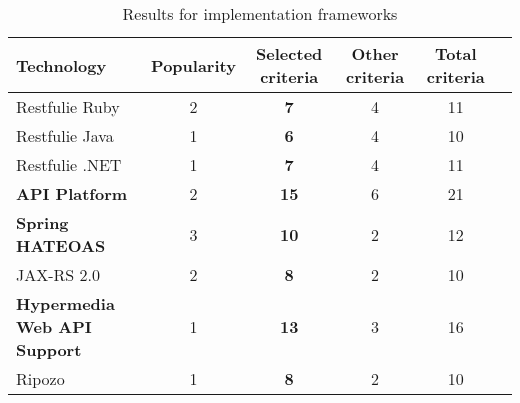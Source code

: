 \begin{table*}[h]
\begin{minipage}[t]{0.5\linewidth}
\begin{tabular}{|l|c|c|c|c|c|}
 \hline
 \textbf{Technology} & \textbf{Popularity} & \textbf{Selected criteria} & \textbf{Other criteria} & \textbf{Total criteria} \\
 \hline
 Restfulie Ruby & 2 & \textbf{7} & 4 & 11 \\
 Restfulie Java & 1 & \textbf{6} & 4 & 10 \\
 Restfulie .NET & 1 & \textbf{7} & 4 & 11 \\
 \rowcolor{lightGreen} \textbf{API Platform} & 2 & \textbf{15} & 6 & 21 \\
 \rowcolor{lightGreen} \textbf{Spring HATEOAS} & 3 & \textbf{10} & 2 & 12 \\
 JAX-RS 2.0 & 2 & \textbf{8} & 2 & 10 \\
 \rowcolor{lightGreen} \textbf{Hypermedia Web API Support} & 1 & \textbf{13} & 3 & 16 \\
 Ripozo & 1 & \textbf{8} & 2 & 10 \\
 \hline
\end{tabular}
\caption{Results for implementation frameworks}
\label{example-frameworks-results}
\end{minipage}
\end{table*}
